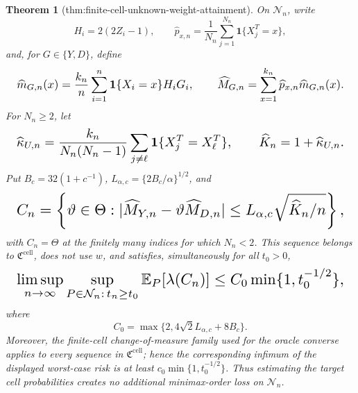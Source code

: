 \documentclass{article}
\newtheorem{theorem}{Theorem}
\begin{document}
\begin{theorem}[thm:finite-cell-unknown-weight-attainment]\label{thm:finite-cell-unknown-weight-attainment}
On \(\mathcal N_n\), write
\[
 H_i=2(2Z_i-1),\qquad
 \widehat p_{x,n}=\frac1{N_n}\sum_{j=1}^{N_n}\mathbf 1\{X_j^T=x\},
\]
and, for \(G\in\{Y,D\}\), define
\[
\makebox[\linewidth][c]{\resizebox{0.98\linewidth}{!}{\(\displaystyle \widehat m_{G,n}(x)=\frac{k_n}{n}\sum_{i=1}^n
 \mathbf 1\{X_i=x\}H_iG_i,\qquad
 \widehat M_{G,n}=\sum_{x=1}^{k_n}\widehat p_{x,n}\widehat m_{G,n}(x).\)}}
\]
For \(N_n\ge2\), let
\[
\makebox[\linewidth][c]{\resizebox{0.98\linewidth}{!}{\(\displaystyle \widehat\kappa_{U,n}=
 \frac{k_n}{N_n(N_n-1)}
 \sum_{j\ne\ell}\mathbf 1\{X_j^T=X_\ell^T\},\qquad
 \widehat K_n=1+\widehat\kappa_{U,n}.\)}}
\]
Put \(B_c=32(1+c^{-1})\), \(L_{\alpha,c}=\{2B_c/\alpha\}^{1/2}\), and
\[
\makebox[\linewidth][c]{\resizebox{0.98\linewidth}{!}{\(\displaystyle C_n=\left\{\vartheta\in\Theta:
 |\widehat M_{Y,n}-\vartheta\widehat M_{D,n}|
 \le L_{\alpha,c}\sqrt{\widehat K_n/n}\right\},\)}}
\]
with \(C_n=\Theta\) at the finitely many indices for which \(N_n<2\).  This sequence belongs to \(\mathfrak C^{\mathrm{cell}}\), does not use \(w\), and satisfies, simultaneously for all \(t_0>0\),
\[
\makebox[\linewidth][c]{\resizebox{0.98\linewidth}{!}{\(\displaystyle \limsup_{n\to\infty}\sup_{P\in\mathcal N_n:\,t_n\ge t_0}
 \mathbb E_P[\lambda(C_n)]
 \le C_0\min\{1,t_0^{-1/2}\},\)}}
\]
where
\[
 C_0=\max\{2,4\sqrt2L_{\alpha,c}+8B_c\}.
\]
Moreover, the finite-cell change-of-measure family used for the oracle converse applies to every sequence in \(\mathfrak C^{\mathrm{cell}}\); hence the corresponding infimum of the displayed worst-case risk is at least \(c_0\min\{1,t_0^{-1/2}\}\).  Thus estimating the target cell probabilities creates no additional minimax-order loss on \(\mathcal N_n\).
\end{theorem}
\end{document}
